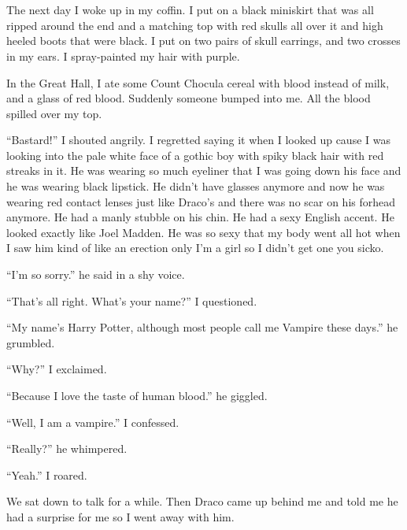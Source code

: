 \section{\chaptername~\thesection}



The next day I woke up in my coffin. I put on a black miniskirt that was all ripped around the end and a matching top with red skulls all over it and high heeled boots that were black. I put on two pairs of skull earrings, and two crosses in my ears. I spray-painted my hair with purple.

\begin{sloppypar}
    In the Great Hall, I ate some Count Chocula cereal with blood instead of milk, and a glass of red blood. Suddenly someone bumped into me. All the blood spilled over my top.
\end{sloppypar}

\enquote{Bastard!} I shouted angrily. I regretted saying it when I looked up cause I was looking into the pale white face of a gothic boy with spiky black hair with red streaks in it. He was wearing so much eyeliner that I was going down his face and he was wearing black lipstick. He didn't have glasses anymore and now he was wearing red contact lenses just like Draco's and there was no scar on his forhead anymore. He had a manly stubble on his chin. He had a sexy English accent. He looked exactly like Joel Madden. He was so sexy that my body went all hot when I saw him kind of like an erection only I'm a girl so I didn't get one you sicko.

\enquote{I'm so sorry.} he said in a shy voice.

\enquote{That's all right. What's your name?} I questioned.

\enquote{My name's Harry Potter, although most people call me Vampire these days.} he grumbled.

\enquote{Why?} I exclaimed.

\enquote{Because I love the taste of human blood.} he giggled.

\enquote{Well, I am a vampire.} I confessed.

\enquote{Really?} he whimpered.

\enquote{Yeah.} I roared.

We sat down to talk for a while. Then Draco came up behind me and told me he had a surprise for me so I went away with him.

